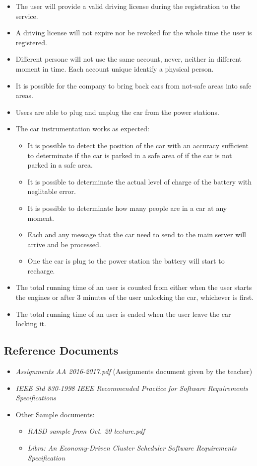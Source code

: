 \documentclass[11pt]{article} %
\begin{document}
\begin{itemize}
	\item The user will provide a valid driving license during the registration to the service.
	\item A driving license will not expire nor be revoked for the whole time the user is registered.
	\item Different persone will not use the same account, never, neither in different moment in time. Each account unique identify a physical person.
	\item It is possible for the company to bring back cars from not-safe areas into safe areas.
	\item Users are able to plug and unplug the car from the power stations.
	\item The car instrumentation works as expected:
	\begin{itemize}
		\item It is possible to detect the position of the car with an accuracy sufficient to determinate if the car is parked in a safe area of if the car is not parked in a safe area.
		\item It is possible to determinate the actual level of charge of the battery with neglitable error.
		\item It is possible to determinate how many people are in a car at any moment.
		\item Each and any message that the car need to send to the main server will arrive and be processed.
		\item One the car is plug to the power station the battery will start to recharge.
	\end{itemize}
	\item The total running time of an user is counted from either when the user starts the engines or after 3 minutes of the user unlocking the car, whichever is first.
	\item The total running time of an user is ended when the user leave the car locking it.
\end{itemize}

\subsection{Reference Documents}
\begin{itemize}
	\item \textit{Assignments AA 2016-2017.pdf} (Assignments document given by the teacher)
	\item \textit{IEEE Std 830-1998 IEEE Recommended Practice for Software Requirements Specifications}
	\item Other Sample documents:
		\begin{itemize}
			\item \textit{RASD sample from Oct. 20 lecture.pdf}
			\item \textit{Libra: An Economy-Driven Cluster Scheduler Software Requirements Specification}
		\end{itemize}
  \end{itemize}
\end{document}
